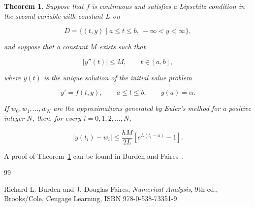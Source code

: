 \documentclass[a4paper]{article}
\newtheorem{theorem}{Theorem}
\begin{document}
\begin{theorem}\label{euler-error-theorem}
Suppose that $f$ is continuous and satisfies a Lipschitz condition in the second variable with constant $L$ on

\begin{equation*}
D=\{(t,y)\mid a\leq t\leq b,\ -\infty<y<\infty\},
\end{equation*}

and suppose that a constant $M$ exists such that

\begin{equation*}
|y''(t)|\leq M, \qquad t\in[a,b],
\end{equation*}

where $y(t)$ is the unique solution of the initial value problem

\begin{equation*}
y'=f(t,y), \qquad a\leq t\leq b, \qquad y(a)=\alpha.
\end{equation*}

If $w_0,w_1,\ldots,w_N$ are the approximations generated by Euler's method for a positive integer $N$, then, for every $i=0,1,2,\ldots,N$,

\begin{equation}
|y(t_i)-w_i|\leq \frac{hM}{2L}\left[e^{L(t_i-a)}-1\right].
\end{equation}
\end{theorem}

A proof of Theorem~\ref{euler-error-theorem} can be found in Burden and Faires~\cite{Burden}.

\begin{thebibliography}{99}

Richard L. Burden and J. Douglas Faires,
\textit{Numerical Analysis},
9th ed., Brooks/Cole, Cengage Learning,
ISBN 978-0-538-73351-9.

\end{thebibliography}
\end{document}
